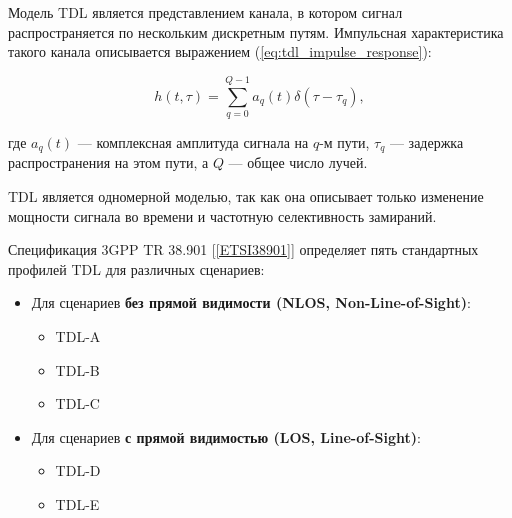 
Модель TDL является представлением канала,
в котором сигнал распространяется по нескольким дискретным путям.
Импульсная характеристика такого канала описывается выражением (\ref{eq:tdl_impulse_response}):

\begin{equation}
    h(t, \tau) = \sum_{q = 0}^{Q - 1} a_q(t) \delta (\tau - \tau_q),
    \label{eq:tdl_impulse_response}
\end{equation}

\noindent где $a_q(t)$ — комплексная амплитуда сигнала на $q$-м пути,
$\tau_q$ — задержка распространения на этом пути, а $Q$ — общее число лучей.

TDL является одномерной моделью, так как она описывает только изменение мощности сигнала
во времени и частотную селективность замираний.

Спецификация 3GPP TR 38.901 [\ref{ETSI38901}] определяет пять стандартных профилей TDL для различных сценариев:
\begin{itemize}
\item Для сценариев \textbf{без прямой видимости (NLOS, Non-Line-of-Sight)}:
\begin{itemize}
\item TDL-A
\item TDL-B
\item TDL-C
\end{itemize}
\item Для сценариев \textbf{с прямой видимостью (LOS, Line-of-Sight)}:
\begin{itemize}
\item TDL-D
\item TDL-E
\end{itemize}
\end{itemize}



